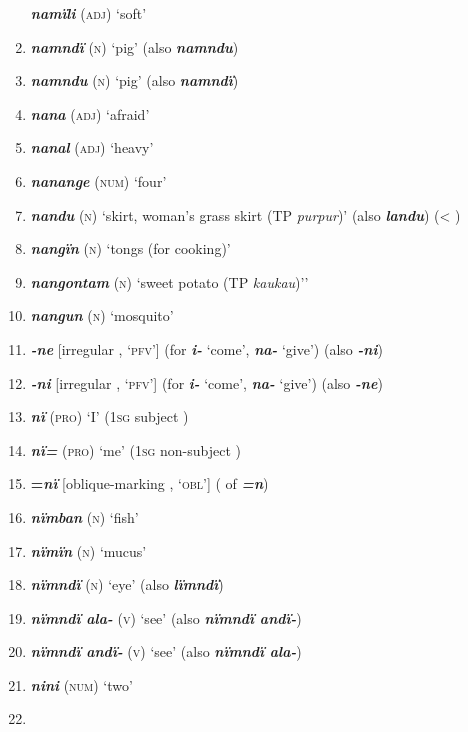 \begin{enumerate}[noitemsep, label={}, align=left, widest=190, labelsep=1ex,leftmargin=*,itemindent=-10pt]
\textbf{\textit{namïli}} (\textsc{adj}) ‘soft’ \item
\textbf{\textit{namndï}} (\textsc{n}) ‘pig’ (also \textbf{\textit{namndu}}) \item
\textbf{\textit{namndu}} (\textsc{n}) ‘pig’ (also \textbf{\textit{namndï}}) \item
\textbf{\textit{nana}} (\textsc{adj}) ‘afraid’ \item
\textbf{\textit{nanal}} (\textsc{adj}) ‘heavy’ \item
\textbf{\textit{nanange}} (\textsc{num}) ‘four’ \item
\textbf{\textit{nandu}} (\textsc{n}) ‘skirt, woman’s grass skirt (TP \textit{purpur})’ (also \textbf{\textit{landu}}) (< ) \item
\textbf{\textit{nangïn}} (\textsc{n}) ‘tongs (for cooking)’ \item
\textbf{\textit{nangontam}} (\textsc{n}) ‘sweet potato (TP \textit{kaukau})’’ \item
\textbf{\textit{nangun}} (\textsc{n}) ‘mosquito’ \item
\textbf{\textit{-ne}} [irregular  , ‘\textsc{pfv}’] (for \textbf{\textit{i-}} ‘come’, \textbf{\textit{na-}} ‘give’) (also \textbf{\textit{-ni}}) \item
\textbf{\textit{-ni}} [irregular  , ‘\textsc{pfv}’]  (for \textbf{\textit{i-}} ‘come’, \textbf{\textit{na-}} ‘give’) (also \textbf{\textit{-ne}})  \item
\textbf{\textit{nï}} (\textsc{pro}) ‘I’ (1\textsc{sg} subject ) \item
\textbf{\textit{nï=}} (\textsc{pro}) ‘me’ (1\textsc{sg} non-subject ) \item
\textbf{=\textit{nï}}  [oblique-marking , ‘\textsc{obl}’] ( of \textbf{\textit{=n}}) \item
\textbf{\textit{nïmban}} (\textsc{n}) ‘fish’ \item
\textbf{\textit{nïmïn}} (\textsc{n}) ‘mucus’ \item
\textbf{\textit{nïmndï}} (\textsc{n}) ‘eye’ (also \textbf{\textit{lïmndï}}) \item
\textbf{\textit{nïmndï ala-}} (\textsc{v}) ‘see’ (also \textbf{\textit{nïmndï andï-}}) \item
\textbf{\textit{nïmndï andï-} }(\textsc{v}) ‘see’ (also \textbf{\textit{nïmndï ala-}}) \item
\textbf{\textit{nini}} (\textsc{num}) ‘two’ \item

\end{enumerate}

